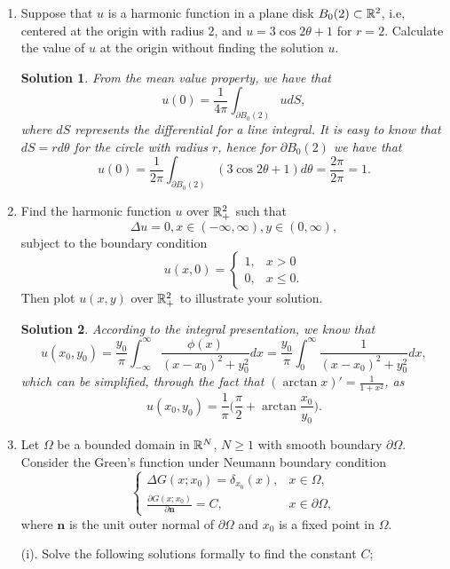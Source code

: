 \documentclass[6pt]{article}
\newtheorem{solution}{Solution}
\numberwithin{equation}{section}
\def\mathbb{\Bbb}
\begin{document}
\begin{enumerate}
\item Suppose that $u$ is a harmonic function in a plane disk $B_0(2)\subset \mathbb R^2$, i.e, centered at the origin with radius 2, and $u=3 \cos 2\theta +1$ for $r=2$.  Calculate the value of $u$ at the origin without finding the solution $u$.
\begin{solution}
From the mean value property, we have that
\[u(0)=\frac{1}{4\pi}\int_{\partial B_0(2)} udS,\]
where $dS$ represents the differential for a line integral.  It is easy to know that $dS= r d\theta$ for the circle with radius $r$, hence for $\partial B_0(2)$ we have that
\[u(0)=\frac{1}{2\pi}\int_{\partial B_0(2)} (3 \cos 2\theta +1)d\theta=\frac{2\pi}{2\pi}=1.\]
\end{solution}

\item Find the harmonic function $u$ over $\mathbb R^2_+$ such that
\[\Delta u=0, x\in(-\infty,\infty),y\in(0,\infty),\]
subject to the boundary condition
\[u(x,0)=
\left\{
\begin{array}{ll}
1,& x>0\\0,&x\leq 0.
\end{array}
\right.
\]
Then plot $u(x,y)$ over $\mathbb R^2_+$ to illustrate your solution.
\begin{solution}
According to the integral presentation, we know that
\[u(x_0,y_0)=\frac{y_0}{\pi}\int_{-\infty}^\infty \frac{\phi(x)}{(x-x_0)^2+y_0^2}dx=\frac{y_0}{\pi}\int_{0}^\infty \frac{1}{(x-x_0)^2+y_0^2}dx,\]
which can be simplified, through the fact that $(\arctan x)'=\frac{1}{1+x^2}$, as
\[u(x_0,y_0)=\frac{1}{\pi}\Big(\frac{\pi}{2}+\arctan \frac{x_0}{y_0}\Big).\]
\end{solution}

\item Let $\Omega$ be a bounded domain in $\mathbb R^N$, $N\geq 1$ with smooth boundary $\partial \Omega$.  Consider the Green's function under Neumann boundary condition
\begin{equation}
\left\{
\begin{array}{ll}
\Delta G(x;x_0)=\delta_{x_0}(x),&x\in \Omega, \\
\frac{\partial G(x;x_0) }{\partial \textbf{n}}=C,& x\in \partial \Omega,
\end{array}
\right.
\end{equation}
where $\textbf{n}$ is the unit outer normal of $\partial \Omega$ and $x_0$ is a fixed point in $\Omega$.

(i).  Solve the following solutions formally to find the constant $C$;


\end{enumerate}
\end{document}
